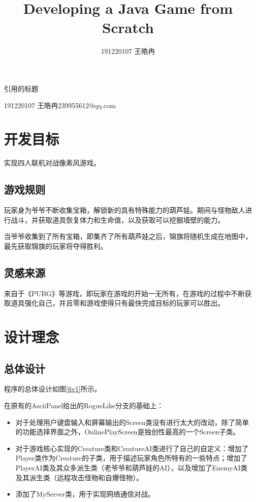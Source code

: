 \documentclass{SCIS2022cn}
\begin{document}
\DOI{}
\ReceiveDate{}
\ReviseDate{}
\AcceptDate{}
\OnlineDate{}
\AuthorMark{}
\AuthorCitation{}
\enAuthorCitation{}

\title{Developing a Java Game from Scratch}{引用的标题}
\author[]{191220107 王皓冉}{191220107 王皓冉}{239955612@qq.com}
\maketitle

\section{开发目标}
实现四人联机对战像素风游戏。

\subsection{游戏规则}
玩家身为爷爷不断收集宝箱，解锁新的具有特殊能力的葫芦娃。期间与怪物敌人进行战斗，并获取道具恢复体力和生命值，以及获取可以挖掘墙壁的能力。

当爷爷收集到了所有宝箱，即集齐了所有葫芦娃之后，锦旗将随机生成在地图中，最先获取锦旗的玩家将夺得胜利。

\subsection{灵感来源}
来自于《PUBG》等游戏，即玩家在游戏的开始一无所有，在游戏的过程中不断获取道具强化自己，并且零和游戏使得只有最快完成目标的玩家可以胜出。


\section{设计理念}
\subsection{总体设计}
程序的总体设计如图\ref{fig1}所示。

在原有的AsciiPanel给出的RogueLike分支的基础上：
\begin{itemize}
    \item 对于处理用户键盘输入和屏幕输出的Screen类没有进行太大的改动，除了简单的功能选择界面之外，OnlinePlayScreen是独创性最高的一个Screen子类。
    \item 对于游戏核心实现的Creature类和CreatureAI类进行了自己的自定义：增加了Player类作为Creature的子类，用于描述玩家角色所特有的一些特点；增加了PlayerAI类及其众多派生类（老爷爷和葫芦娃的AI），以及增加了EnemyAI类及其派生类（远程攻击怪物和自爆怪物）。
    \item 添加了MyServer类，用于实现网络通信对战。
\end{itemize}
\end{document}
